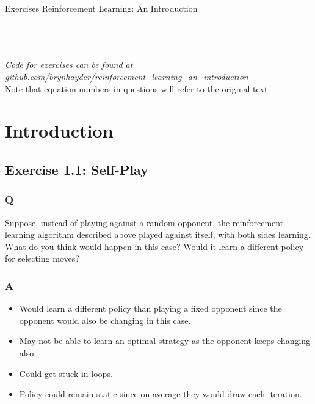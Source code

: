 

\newcommand\ProgrammingExercise{This is a programming exercise. For the relevant code please see \href{\RepoAddress{}}{the repo}.}




{\huge Exercises} \hfill {\huge Reinforcement Learning: An Introduction}\\
\Rule\\
\tableofcontents
\mbox{}\\
\Rule
\mbox{}\\


\setcounter{secnumdepth}{2}

\clearpage
\vfill
\thispagestyle{empty}
\begin{center}
    \emph{Code for exercises can be found at \href{\RepoAddress{}}{github.com/brynhayder/reinforcement\_learning\_an\_introduction}}\\[2cm]
Note that equation numbers in questions will refer to the original text.
\vfill
\end{center}
\clearpage
\section{Introduction}
\subsection{Exercise 1.1: Self-Play}
\subsubsection{Q}
Suppose, instead of playing against a random opponent, the reinforcement learning algorithm described above played against itself, with both sides learning. What do you think would happen in this case? Would it learn a different policy for selecting moves?

\subsubsection{A}
\begin{itemize}
    \item Would learn a different policy than playing a fixed opponent since the opponent would also be changing in this case.
    \item May not be able to learn an optimal strategy as the opponent keeps changing also.
    \item Could get stuck in loops.
    \item Policy could remain static since on average they would draw each iteration.
\end{itemize}


